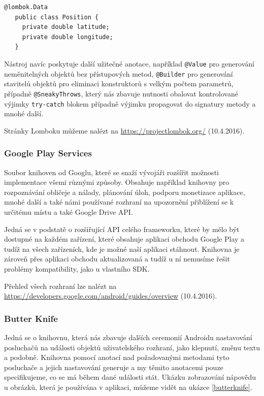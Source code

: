 \documentclass[czech,master,public,dept460,male,java,cpdeclaration]{diploma}
\begin{document}
\begin{lstlisting}[label=lombokshowcase,caption=Datová třída používající Lombok]
   @lombok.Data
   public class Position {
     private double latitude;
     private double longitude;
   }
\end{lstlisting}

Nástroj navíc poskytuje další užitečné anotace, například \texttt{@Value} pro generování neměnitelných objektů
bez přístupových metod, \texttt{@Builder} pro generování stavitelů objektů pro eliminaci konstruktorů s velkým
počtem parametrů, případně \texttt{@SneakyThrows}, který nás zbavuje nutnosti obalovat kontrolované výjimky
\texttt{try-catch} blokem případně výjimku propagovat do signatury metody a mnohé další.

Stránky Lomboku můžeme nalézt na \url{https://projectlombok.org/}  (10.4.2016).

\subsubsection{Google Play Services}
Soubor knihoven od Googlu, které se snaží vývojáři rozšířit možnosti implementace všemi různými způsoby.
Obsahuje například knihovny pro rozpoznávání obličeje a nálady, plánování úloh, podporu monetizace aplikace,
mnohé další a také námi používané rozhraní na upozornění přiblížení se k určitému místu a také Google Drive API.

Jedná se v podstatě o rozšiřující API celého frameworku, které by mělo být dostupné na každém zařízení, které
obsahuje aplikaci obchodu Google Play a tudíž na všech zařízeních, kde je možné naší aplikaci stáhnout.
Knihovna je zároveň přes aplikaci obchodu aktualizovaná a tudíž u ní nemusíme řešit problémy
kompatibility, jako u vlastního SDK. \cite{gms}

Přehled všech rozhraní lze nalézt na \url{https://developers.google.com/android/guides/overview}  (10.4.2016).

\subsubsection{Butter Knife}
Jedná se o knihovnu, která nás zbavuje dalších ceremonií Androidu nastavování posluchačů
na události objektů uživatelského rozhraní, jako klepnutí, změnu textu a podobně. Knihovna pomocí
anotací nad požadovanými metodami tyto posluchače a jejich nastavování generuje a my těmito anotacemi
pouze specifikujeme, co se má během dané události stát. Ukázku zobrazování nápovědu u obrázků, která je
používána v aplikaci, můžeme vidět na ukázce \ref{butterknife}.
\end{document}

